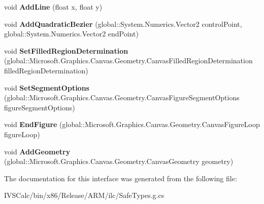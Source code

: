 \begin{DoxyCompactItemize}
void {\bfseries Add\+Line} (float x, float y)
\item 
\mbox{\label{interface_microsoft_1_1_graphics_1_1_canvas_1_1_geometry_1_1_i_canvas_path_builder_ac8de702afe0be29d6775abc66e63ac50}} 
void {\bfseries Add\+Quadratic\+Bezier} (global\+::\+System.\+Numerics.\+Vector2 control\+Point, global\+::\+System.\+Numerics.\+Vector2 end\+Point)
\item 
\mbox{\label{interface_microsoft_1_1_graphics_1_1_canvas_1_1_geometry_1_1_i_canvas_path_builder_acc584830d3f1748c8144e3800c457004}} 
void {\bfseries Set\+Filled\+Region\+Determination} (global\+::\+Microsoft.\+Graphics.\+Canvas.\+Geometry.\+Canvas\+Filled\+Region\+Determination filled\+Region\+Determination)
\item 
\mbox{\label{interface_microsoft_1_1_graphics_1_1_canvas_1_1_geometry_1_1_i_canvas_path_builder_af370ca945a2f94ff7cc968d77512fd8d}} 
void {\bfseries Set\+Segment\+Options} (global\+::\+Microsoft.\+Graphics.\+Canvas.\+Geometry.\+Canvas\+Figure\+Segment\+Options figure\+Segment\+Options)
\item 
\mbox{\label{interface_microsoft_1_1_graphics_1_1_canvas_1_1_geometry_1_1_i_canvas_path_builder_a9ce31a3bed6a5118d4e16140a1c21484}} 
void {\bfseries End\+Figure} (global\+::\+Microsoft.\+Graphics.\+Canvas.\+Geometry.\+Canvas\+Figure\+Loop figure\+Loop)
\item 
\mbox{\label{interface_microsoft_1_1_graphics_1_1_canvas_1_1_geometry_1_1_i_canvas_path_builder_aa46920a62d2d31a461ff0078c07432cf}} 
void {\bfseries Add\+Geometry} (global\+::\+Microsoft.\+Graphics.\+Canvas.\+Geometry.\+Canvas\+Geometry geometry)
\end{DoxyCompactItemize}


The documentation for this interface was generated from the following file\+:\begin{DoxyCompactItemize}
\item 
I\+V\+S\+Calc/bin/x86/\+Release/\+A\+R\+M/ilc/Safe\+Types.\+g.\+cs\end{DoxyCompactItemize}
